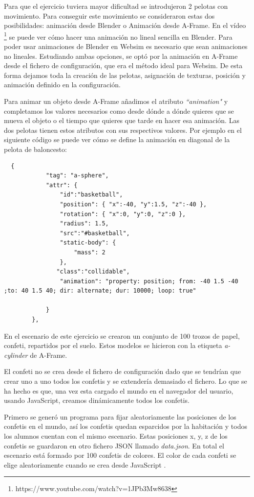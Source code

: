 Para que el ejercicio tuviera mayor dificultad se introdujeron 2 pelotas con movimiento. Para conseguir este movimiento se consideraron estas dos posibilidades: animación desde Blender o Animación desde A-Frame. 
En el vídeo \footnote{https://www.youtube.com/watch?v=1JPb3Mw8638}  se puede ver cómo hacer una animación no lineal sencilla en Blender. Para poder usar animaciones de Blender en Websim es necesario que sean animaciones no lineales. Estudiando ambas opciones, se optó por la animación en A-Frame desde el fichero de configuración, que era el método ideal para Websim. De esta forma dejamos toda la creación de las pelotas, asignación de texturas, posición y  animación definido en la configuración.

Para animar un objeto desde A-Frame añadimos el atributo \textit{``animation"} y completamos los valores necesarios como desde dónde a dónde quieres que se mueva  el objeto o el tiempo que quieres que tarde en hacer esa animación. Las dos pelotas tienen estos atributos con sus respectivos valores. Por ejemplo en el siguiente código se puede ver cómo se define la animación en diagonal de la pelota de baloncesto: 
\begin{lstlisting}
  {
            "tag": "a-sphere",
            "attr": {
                "id":"basketball",
                "position": { "x":-40, "y":1.5, "z":-40 },
                "rotation": { "x":0, "y":0, "z":0 },
                "radius": 1.5,
                "src":"#basketball",
                "static-body": {
                    "mass": 2
                },              
	           "class":"collidable",
                "animation": "property: position; from: -40 1.5 -40 ;to: 40 1.5 40; dir: alternate; dur: 10000; loop: true"

            }
        },

\end{lstlisting}

En el escenario de este ejercicio se crearon un conjunto de 100 trozos de papel, confeti, repartidos por el suelo. Estos modelos se hicieron con la etiqueta \textit{a-cylinder} de A-Frame.  

El confeti no se crea desde el fichero de configuración dado que se tendrían que crear uno a uno  todos los confetis y se extendería demasiado el fichero. Lo que se ha hecho es que, una vez esta cargado el mundo en el navegador del usuario, usando JavaScript, creamos dinámicamente todos los confetis.

Primero se generó un programa para fijar aleatoriamente las posiciones de los confetis en el mundo, así los confetis quedan esparcidos por la habitación y todos los alumnos cuentan con el mismo escenario. Estas posiciones x, y, z de los confetis se guardaron en otro fichero JSON llamado \textit{data.json}. En total el escenario está formado por 100 confetis de colores. El color de cada confeti se elige aleatoriamente cuando se crea desde JavaScript .

